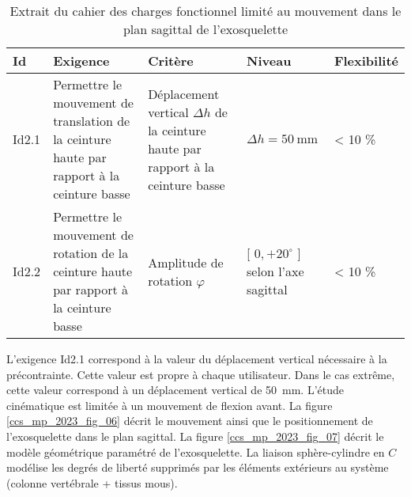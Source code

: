\begin{table}[h]
\begin{center}
\begin{tabular}{|l|p{4cm}|p{4cm}|l|l|}
\hline
Id & Exigence & Critère & Niveau & Flexibilité \\
\hline
Id2.1 & Permettre le mouvement de translation de la ceinture haute par rapport à la ceinture basse & Déplacement vertical $\Delta h$ de la ceinture haute par rapport à la ceinture basse & $\Delta h=50 \mathrm{~mm}$ & < 10 \% \\
\hline
Id2.2 & Permettre le mouvement de rotation de la ceinture haute par rapport à la ceinture basse & Amplitude de rotation $\varphi$ & [ $0,+20^{\circ}$ ] selon l'axe sagittal & < 10 \% \\
\hline
\end{tabular}
\caption{\label{ccs_mp_2023_tab_02}Extrait du cahier des charges fonctionnel limité au mouvement dans le plan sagittal de l'exosquelette}
\end{center}
\end{table}

L'exigence Id2.1 correspond à la valeur du déplacement vertical nécessaire à la précontrainte. Cette valeur est propre à chaque utilisateur. Dans le cas extrême, cette valeur correspond à un déplacement vertical de \SI{50}{mm}. L'étude cinématique est limitée à un mouvement de flexion avant. La figure \ref{ccs_mp_2023_fig_06} décrit le mouvement ainsi que le positionnement de l'exosquelette dans le plan sagittal. La figure \ref{ccs_mp_2023_fig_07} décrit le modèle géométrique paramétré de l'exosquelette. La liaison sphère-cylindre en $C$ modélise les degrés de liberté supprimés par les éléments extérieurs au système (colonne vertébrale + tissus mous).\\

\ifprof
\begin{corrige}
\end{corrige}
\else
\fi




